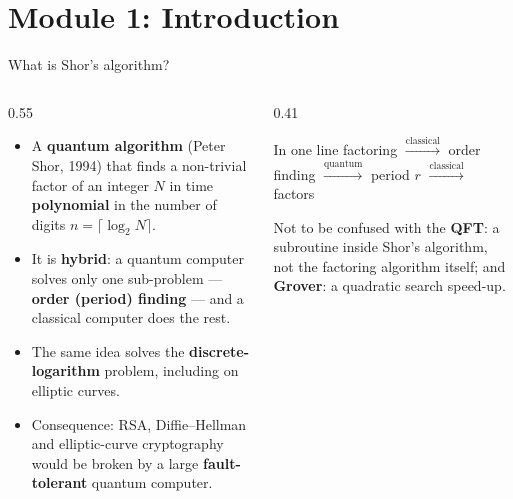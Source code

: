\documentclass[aspectratio=169,11pt]{beamer}
\newcommand{\hl}[1]{{\color{qorange}\textbf{#1}}}
\newcommand{\key}[1]{{\color{qdark}\textbf{#1}}}
\begin{document}
\section{Module 1: Introduction}
\begin{frame}[label=fWhat]{What is Shor's algorithm?}
  \begin{columns}[T]
    \begin{column}{0.55\textwidth}
      \small
      \begin{itemize}\itemsep2pt
        \item A \key{quantum algorithm} (Peter Shor, 1994) that finds a non-trivial factor of an integer $N$ in time \hl{polynomial} in the
              number of digits $n = \lceil\log_2 N\rceil$.
        \item It is \key{hybrid}: a quantum computer solves only one sub-problem --- \key{order (period) finding} --- and a classical computer does the rest.
        \item The same idea solves the \key{discrete-logarithm} problem, including on elliptic curves.
        \item Consequence: RSA, Diffie--Hellman and elliptic-curve cryptography would be broken by a large \hl{fault-tolerant} quantum computer.
      \end{itemize}
    \end{column}
    \begin{column}{0.41\textwidth}
      \begin{block}{In one line}
        \small factoring $\xrightarrow{\text{classical}}$ order finding $\xrightarrow{\text{quantum}}$ period $r$ $\xrightarrow{\text{classical}}$ factors
      \end{block}
      \begin{alertblock}{Not to be confused with}
        \scriptsize the \key{QFT}: a subroutine inside Shor's algorithm, not the factoring algorithm itself; and \key{Grover}: a quadratic search speed-up.
      \end{alertblock}
    \end{column}
  \end{columns}
\end{frame}
\end{document}
